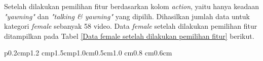 \begin{table}[H]
        Setelah dilakukan pemilihan fitur berdasarkan kolom 
        \textit{action}, yaitu hanya keadaan \textit{"yawning"} dan
         \textit{"talking \& yawning"} yang dipilih. Dihasilkan 
         jumlah data untuk kategori \textit{female} sebanyak 58 video. 
         Data \textit{female} setelah dilakukan pemilihan fitur 
         ditampilkan pada Tabel \ref{Data female setelah dilakukan pemilihan fitur} berikut.

        \begin{table}[H]
\centering
\caption{Data \textit{Female} Setelah Dilakukan Pemilihan Fitur}
\label{Data female setelah dilakukan pemilihan fitur}
\scriptsize

    \begin{tabular}{p{0.2cm}p{1.2 cm}p{1.5cm}p{1.0cm}{0.5cm}{1.0 cm}{0.8 cm}{0.6cm}}
    

\end{tabular}
\end{table}
\end{table}
